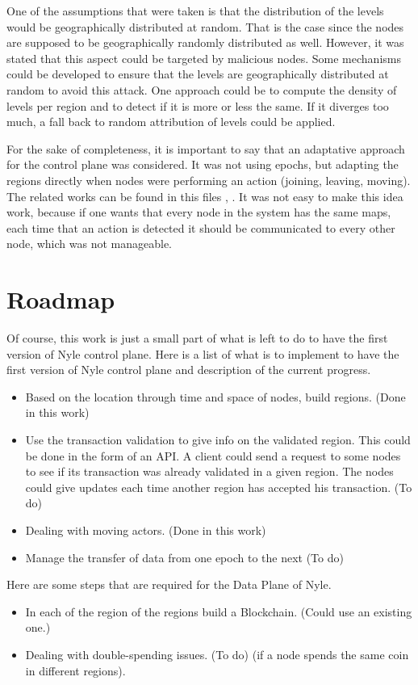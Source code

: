 \documentclass[a4paper,11pt,twoside=semi,openright]{report}
\begin{document}
One of the assumptions that were taken is that the distribution of the levels
would be geographically distributed at random. That is the case since the
nodes are supposed to be geographically randomly distributed as well.
However, it was stated that this aspect could be targeted by malicious nodes.
 Some mechanisms could be developed to ensure
that the levels are geographically distributed at random to avoid this attack.
One approach could be to compute the density of levels per region and to detect
if it is more or less the same. If it diverges too much, a fall back to random
attribution of levels could be applied. 

For the sake of completeness, it is important to say that an adaptative
approach for the control plane was considered. It was not using epochs, but
adapting the regions directly when nodes were performing an action (joining,
leaving, moving). The related works can be found in this files
\cite{ArnaudPannatier2019}, \cite{ArnaudPannatierWorks2019}. It was not easy to
make this idea work, because if one wants that every node in the system has the
same maps, each time that an action is detected it should be communicated to
every other node, which was not manageable. 

\section{Roadmap}
Of course, this work is just a small part of what is left to do to have the first
version of Nyle control plane. Here is a list of what is to implement to have
the first version of Nyle control plane and description of the current
progress.

\begin{itemize} 
\item Based on the location through time and space of nodes, build regions.
(Done in this work)
\item Use the transaction validation to give info on the validated region. This
could be done in the form of an API. A client could send a request to some
nodes to see if its transaction was already validated in a given region. The
nodes could give updates each time another region has accepted his transaction.
(To do)
\item Dealing with moving actors. (Done in this work)
\item Manage the transfer of data from one epoch to the next (To do)
\end{itemize}

Here are some steps that are required for the Data Plane of Nyle. 
\begin{itemize} 
\item In each of the region of the regions build a Blockchain. (Could use an
 existing one.)
 \item Dealing with double-spending issues. (To do)
(if a node spends the same coin in different regions). 
\end{itemize}
\end{document}
